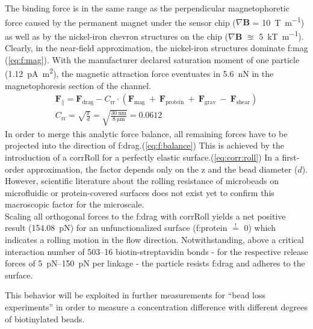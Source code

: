 The binding force is in the same range as the perpendicular magnetophoretic force caused by the permanent magnet under the sensor chip ($\nabla \mathbf{B}$ = \SI{10}{\tesla\per\meter}) as well as by the nickel-iron chevron structures on the chip ($\nabla \mathbf{B}$ $\approxeq$ \SI{5}{\kilo\tesla\per\meter}). Clearly, in the near-field approximation, the nickel-iron structures dominate \gls{f:mag} (\cref{eq:f:mag}). With the manufacturer declared saturation moment of one particle (\SI{1.12}{\pico\ampere\meter\squared}), the magnetic attraction force eventuates in \SI{5.6}{\nano\newton} in the magnetophoresis section of the channel.
\begin{align}
	\mathbf{F}_\parallel = \mathbf{F}_\text{drag} - C_\text{rr} \cdot (\mathbf{F}_\text{mag} \ +\ \mathbf{F}_\text{protein}  \ +\ \mathbf{F}_\text{grav}\ -\ \mathbf{F}_\text{shear} ) \label{eq:f:balance} \\
	C_\text{rr} = \sqrt{\frac{\text{z}}{d}} = \sqrt{\frac{\SI{30}{\nano\meter}}{\SI{8}{\micro\meter}}} = \num{0.0612} \label{eq:corr:roll}
\end{align}
\clearpage
In order to merge this analytic force balance, all remaining forces have to be projected into the direction of \acrfull{f:drag}.(\cref{eq:f:balance}) This is achieved by the introduction of a \gls{corrRoll} for a perfectly elastic surface.(\cref{eq:corr:roll}) In a first-order approximation, the factor depends only on the \acrfull{z} and the bead diameter ($d$). However, scientific literature about the rolling resistance of microbeads on microfluidic or protein-covered surfaces does not exist yet to confirm this macroscopic factor for the microscale. \\
Scaling all orthogonal forces to the \acrlong{f:drag} with \gls{corrRoll} yields a net positive result (\SI{154.08}{\pico\newton}) for an unfunctionalized surface (\gls{f:protein} $\overset{!}{=}$ \num{0}) which indicates a rolling motion in the flow direction. Notwithstanding, above a critical interaction number of \numrange{503}{16} biotin-streptavidin bonds - for the respective release forces of \SIrange{5}{150}{\pico\newton} per linkage - the particle resists \acrlong{f:drag} and adheres to the surface.

This behavior will be exploited in further measurements for ``bead loss experiments'' in order to measure a concentration difference with different degrees of biotinylated beads.


\clearpage

